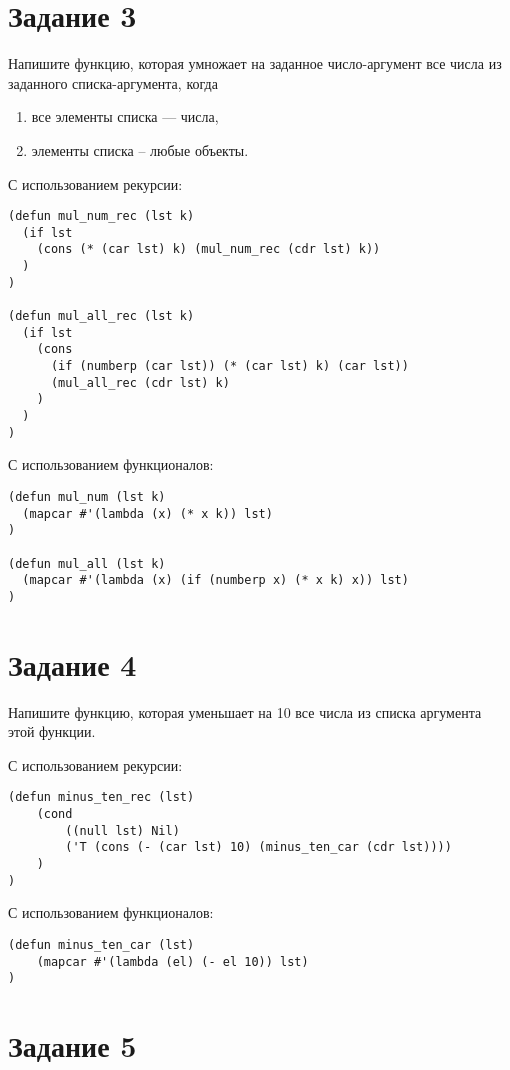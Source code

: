 \section{Задание \No{}3}

Напишите функцию, которая умножает на заданное число-аргумент все числа
из заданного списка-аргумента, когда
\begin{enumerate}
\item все элементы списка --- числа,
\item элементы списка -- любые объекты.
\end{enumerate}

С использованием рекурсии:

\begin{lstlisting}
(defun mul_num_rec (lst k)
  (if lst
    (cons (* (car lst) k) (mul_num_rec (cdr lst) k))
  )
)

(defun mul_all_rec (lst k)
  (if lst
    (cons
      (if (numberp (car lst)) (* (car lst) k) (car lst))
      (mul_all_rec (cdr lst) k)
    )
  )
)
\end{lstlisting}

С использованием функционалов:

\begin{lstlisting}
(defun mul_num (lst k)
  (mapcar #'(lambda (x) (* x k)) lst)
)

(defun mul_all (lst k)
  (mapcar #'(lambda (x) (if (numberp x) (* x k) x)) lst)
)
\end{lstlisting}

\section{Задание \No{}4}

Напишите функцию, которая уменьшает на 10 все числа из списка
аргумента этой функции.

С использованием рекурсии:
\begin{lstlisting}
(defun minus_ten_rec (lst)
    (cond
        ((null lst) Nil)
        ('T (cons (- (car lst) 10) (minus_ten_car (cdr lst))))
    )
)
\end{lstlisting}

С использованием функционалов:
\begin{lstlisting}
(defun minus_ten_car (lst)
    (mapcar #'(lambda (el) (- el 10)) lst)
)
\end{lstlisting}

\section{Задание \No{}5}

